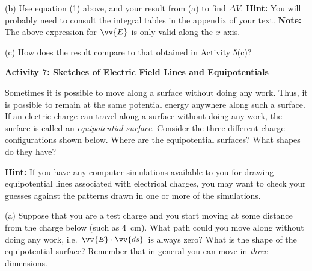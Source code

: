 (b) Use equation (1) above, and your result from (a) to find $\Delta V$.  \textbf{Hint:} You will probably need to consult the integral tables in the appendix of your text.
\textbf{Note:} The above expression for $\vv{E}$ is only valid along the $x$-axis.
\answerspace{30mm}

(c) How does the result compare to that obtained in Activity 5(c)?
\answerspace{10mm}

\pagebreak[2]
\textbf{Activity 7: Sketches of Electric Field Lines and Equipotentials}

Sometimes it is possible to move along a surface without doing any
work. Thus, it is possible to remain at the same potential energy
anywhere along such a surface. If an electric charge can travel along
a surface without doing any work, the surface is called an \emph{equipotential
surface}.
Consider the three different charge configurations shown below. Where
are the equipotential surfaces? What shapes do they have?

\textbf{Hint:} If you have any computer simulations available to you
for drawing equipotential lines associated with electrical charges,
you may want to check your guesses against the patterns drawn in one
or more of the simulations.

(a) Suppose that you are a test charge and you start moving at some
distance from the charge below (such as 4~cm). What path could you
move along without doing any work, i.e. $\vv{E}\cdot \vv{ds}$
is always zero? What is the shape of the equipotential surface? Remember
that in general you can move in \emph{three} dimensions.

{\centering {} \par}

